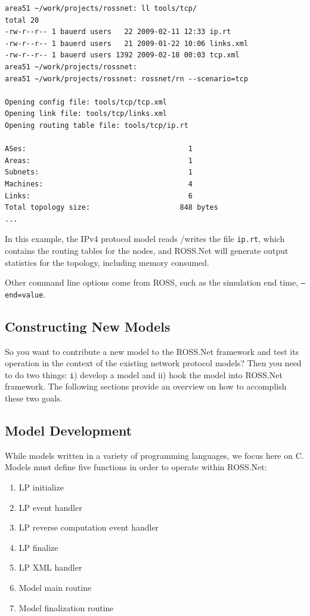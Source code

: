 \documentclass[12pt]{article}
\begin{document}
\begin{small}
\begin{verbatim}
area51 ~/work/projects/rossnet: ll tools/tcp/
total 20
-rw-r--r-- 1 bauerd users   22 2009-02-11 12:33 ip.rt
-rw-r--r-- 1 bauerd users   21 2009-01-22 10:06 links.xml
-rw-r--r-- 1 bauerd users 1392 2009-02-18 00:03 tcp.xml
area51 ~/work/projects/rossnet:
area51 ~/work/projects/rossnet: rossnet/rn --scenario=tcp

Opening config file: tools/tcp/tcp.xml
Opening link file: tools/tcp/links.xml
Opening routing table file: tools/tcp/ip.rt

ASes:                                      1
Areas:                                     1
Subnets:                                   1
Machines:                                  4
Links:                                     6
Total topology size:                     848 bytes
...
\end{verbatim}
\end{small}

In this example, the IPv4 protocol model reads /writes the file {\tt ip.rt},
which contains the routing tables for the nodes, and ROSS.Net will generate
output statistics for the topology, including memory consumed.

Other command line options come from ROSS, such as the simulation end time,
{\tt --end=value}.

\subsection{Constructing New Models}

So you want to contribute a new model to the ROSS.Net framework and test its
operation in the context of the existing network protocol models?  Then you
need to do two things: {\texttt i) develop a model and ii) hook the model into
  ROSS.Net framework}.  The following sections provide an overview on how to
accomplish these two goals.

\subsection{Model Development}
\label{model-development}
While models written in a variety of programming languages, we focus here on
C.  Models must define five functions in order to operate within ROSS.Net:

\begin{enumerate}
  \item LP initialize
  \item LP event handler
  \item LP reverse computation event handler
  \item LP finalize
  \item LP XML handler
  \item Model main routine
  \item Model finalization routine
\end{enumerate}
\end{document}
